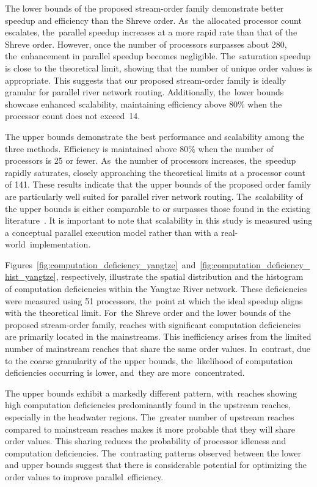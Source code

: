 \documentclass[water,article,accept,pdftex,moreauthors]{Definitions/mdpi}
\begin{document}
The lower bounds of the proposed stream-order family demonstrate better speedup and efficiency than the Shreve order. As~the allocated processor count escalates, the~parallel speedup increases at a more rapid rate than that of the Shreve order. However, once the number of processors surpasses about 280, the~enhancement in parallel speedup becomes negligible. The~saturation speedup is close to the theoretical limit, showing that the number of unique order values is appropriate. This suggests that our proposed stream-order family is ideally granular for parallel river network routing. Additionally, the~lower bounds showcase enhanced scalability, maintaining efficiency above 80\% when the processor count does not exceed~14.

The upper bounds demonstrate the best performance and scalability among the three methods. Efficiency is maintained above 80\% when the number of processors is 25 or fewer. As~the number of processors increases, the~speedup rapidly saturates, closely approaching the theoretical limits at a processor count of 141. These results indicate that the upper bounds of the proposed order family are particularly well suited for parallel river network routing. The~scalability of the upper bounds is either comparable to or surpasses those found in the existing literature~\cite{mizukami2021JAMES, liu2023JH}. It is important to note that scalability in this study is measured using a conceptual parallel execution model rather than with a real-world~implementation.


Figures~\ref{fig:computation_deficiency_yangtze}~and~\ref{fig:computation_deficiency_hist_yangtze}, respectively, illustrate the spatial distribution and the histogram of computation deficiencies within the Yangtze River network. These deficiencies were measured using 51 processors, the~point at which the ideal speedup aligns with the theoretical limit. For~the Shreve order and the lower bounds of the proposed stream-order family, reaches with significant computation deficiencies are primarily located in the mainstreams. This inefficiency arises from the limited number of mainstream reaches that share the same order values. In~contrast, due to the coarse granularity of the upper bounds, the~likelihood of computation deficiencies occurring is lower, and~they are more~concentrated.

The upper bounds exhibit a markedly different pattern, with~reaches showing high computation deficiencies predominantly found in the upstream reaches, especially in the headwater regions. The~greater number of upstream reaches compared to mainstream reaches makes it more probable that they will share order values. This sharing reduces the probability of processor idleness and computation deficiencies. The~contrasting patterns observed between the lower and upper bounds suggest that there is considerable potential for optimizing the order values to improve parallel~efficiency.
\end{document}
